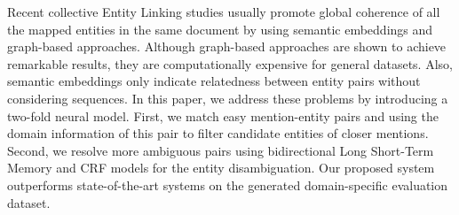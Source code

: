 Recent collective Entity Linking studies usually promote global coherence of all the mapped entities in the same document by using semantic embeddings and graph-based approaches. Although graph-based approaches are shown to achieve remarkable results, they are computationally expensive for general datasets. Also, semantic embeddings only indicate relatedness between entity pairs without considering sequences. In this paper, we address these problems by introducing a two-fold neural model. First, we match easy mention-entity pairs and using the domain information of this pair to filter candidate entities of closer mentions. Second, we resolve more ambiguous pairs using bidirectional Long Short-Term Memory and CRF models for the entity disambiguation. Our proposed system outperforms state-of-the-art systems on the generated domain-specific evaluation dataset.
